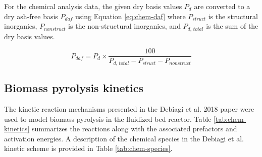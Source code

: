For the chemical analysis data, the given dry basis values $P_d$ are converted to a dry ash-free basis $P_{daf}$ using Equation \ref{eq:chem-daf} where $P_{struct}$ is the structural inorganics, $P_{nonstruct}$ is the non-structural inorganics, and $P_{d,\,total}$ is the sum of the dry basis values.

\begin{equation}
    \label{eq:chem-daf}
    P_{daf} = P_d \times \frac{100}{P_{d,\,total} - P_{struct} - P_{nonstruct}}
\end{equation}

\subsection{Biomass pyrolysis kinetics}

The kinetic reaction mechanisms presented in the Debiagi et al. 2018 paper \cite{Debiagi-2018} were used to model biomass pyrolysis in the fluidized bed reactor. Table \ref{tab:chem-kinetics} summarizes the reactions along with the associated prefactors and activation energies. A description of the chemical species in the Debiagi et al. kinetic scheme is provided in Table \ref{tab:chem-species}.

